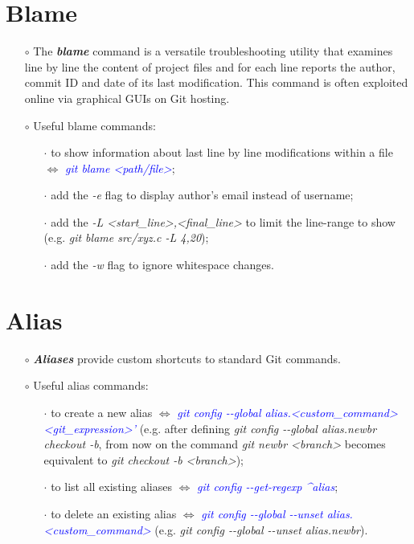 \documentclass[a4paper,portrait,10pt]{article}   %
\newcommand{\mybulletlvA}{$\circ$}   %
\newcommand{\mybulletlvB}{$\cdot$}   %
\newcommand{\mydiv}{$\Leftrightarrow$ }   %
\newcommand{\mysapo}[1]{\textquotesingle #1\textquotesingle }   %
\newcommand{\mycmd}[1]{\textcolor{blue}{\textit{#1}}}   %
\newcommand{\myvspace}{\vspace{4mm}}   %
\begin{document}
\section{Blame}   \label{sec:Blame}

\begin{itemize}
\item[\mybulletlvA] The \textbf{\textit{blame}} command is a versatile troubleshooting utility that examines line by line the content of project files and for each line reports the author, commit ID and date of its last modification. This command is often exploited online via graphical GUIs on Git hosting.
\myvspace

\item[\mybulletlvA] Useful blame commands:
\begin{itemize}
  \item[\mybulletlvB] to show information about last line by line modifications within a file \mydiv \mycmd{git blame <path/file>};
  \item[\mybulletlvB] add the \textit{-e} flag to display author's email instead of username;
  \item[\mybulletlvB] add the \textit{-L <start\_line>,<final\_line>} to limit the line-range to show (e.g. \textit{git blame src/xyz.c -L 4,20});
  \item[\mybulletlvB] add the \textit{-w} flag to ignore whitespace changes.
\end{itemize}
\end{itemize}
\myvspace


\section{Alias}   \label{sec:Alias}

\begin{itemize}
\item[\mybulletlvA] \textbf{\textit{Aliases}} provide custom shortcuts to standard Git commands.
\myvspace

\item[\mybulletlvA] Useful alias commands:
\begin{itemize}
  \item[\mybulletlvB] to create a new alias \mydiv \mycmd{git config -{}-global alias.<custom\_command> \mysapo{<git\_expression>}'} (e.g. after defining \textit{git config -{}-global alias.newbr \mysapo{checkout -b}}, from now on the command \textit{git newbr <branch>} becomes equivalent to \textit{git checkout -b <branch>});
  \item[\mybulletlvB] to list all existing aliases \mydiv \mycmd{git config -{}-get-regexp \textasciicircum alias};
  \item[\mybulletlvB] to delete an existing alias \mydiv \mycmd{git config -{}-global -{}-unset alias.<custom\_command>} (e.g. \textit{git config -{}-global -{}-unset alias.newbr}).
\end{itemize}
\end{itemize}
\myvspace
\end{document}

